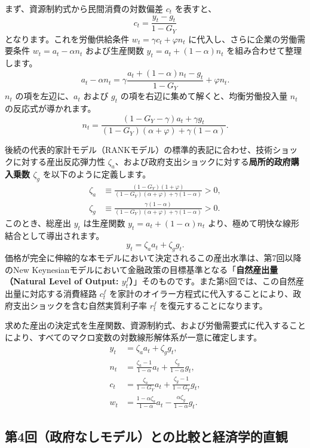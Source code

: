 \documentclass[
  japanese,
  lualatex,
  ja=standard,
  12pt,
  a4paper]{ltjsarticle}
\begin{document}
まず、資源制約式から民間消費の対数偏差 \(c_t\) を表すと、 \[
c_t = \frac{y_t - g_t}{1-G_Y}
\] となります。これを労働供給条件 \(w_t = \gamma c_t + \varphi n_t\)
に代入し、さらに企業の労働需要条件 \(w_t = a_t - \alpha n_t\)
および生産関数 \(y_t = a_t + (1-\alpha)n_t\) を組み合わせて整理します。
\[
a_t - \alpha n_t = \gamma \frac{a_t + (1-\alpha)n_t - g_t}{1-G_Y} + \varphi n_t.
\] \(n_t\) の項を左辺に、\(a_t\) および \(g_t\)
の項を右辺に集めて解くと、均衡労働投入量 \(n_t\) の反応式が導かれます。
\[
n_t = \frac{(1-G_Y-\gamma) a_t + \gamma g_t}{(1-G_Y)(\alpha+\varphi) + \gamma(1-\alpha)}.
\]

後続の代表的家計モデル（RANKモデル）の標準的表記に合わせ、技術ショックに対する産出反応弾力性
\(\zeta_a\)、および政府支出ショックに対する\textbf{局所的政府購入乗数
\(\zeta_g\)} を以下のように定義します。 \[
\begin{aligned}
\zeta_a &\equiv \frac{(1-G_Y)(1+\varphi)}{(1-G_Y)(\alpha+\varphi) + \gamma(1-\alpha)} > 0,\\
\zeta_g &\equiv \frac{\gamma(1-\alpha)}{(1-G_Y)(\alpha+\varphi) + \gamma(1-\alpha)} > 0.
\end{aligned}
\] このとき、総産出 \(y_t\) は生産関数 \(y_t = a_t + (1-\alpha)n_t\)
より、極めて明快な線形結合として導出されます。 \[
y_t = \zeta_a a_t + \zeta_g g_t.
\]
価格が完全に伸縮的な本モデルにおいて決定されるこの産出水準は、第7回以降のNew
Keynesianモデルにおいて金融政策の目標基準となる「\textbf{自然産出量（Natural
Level of Output:
\(y_t^f\)）}」そのものです。また第8回では、この自然産出量に対応する消費経路
\(c_t^f\)
を家計のオイラー方程式に代入することにより、政府支出ショックを含む自然実質利子率
\(r_t^f\) を復元することになります。

求めた産出の決定式を生産関数、資源制約式、および労働需要式に代入することにより、すべてのマクロ変数の対数線形解体系が一意に確定します。
\[
\begin{aligned}
y_t &= \zeta_a a_t + \zeta_g g_t,\\
n_t &= \frac{\zeta_a - 1}{1-\alpha} a_t + \frac{\zeta_g}{1-\alpha} g_t,\\
c_t &= \frac{\zeta_a}{1-G_Y} a_t + \frac{\zeta_g - 1}{1-G_Y} g_t,\\
w_t &= \frac{1-\alpha\zeta_a}{1-\alpha} a_t - \frac{\alpha\zeta_g}{1-\alpha} g_t.
\end{aligned}
\]

\subsection{第4回（政府なしモデル）との比較と経済学的直観}\label{ux7b2c4ux56deux653fux5e9cux306aux3057ux30e2ux30c7ux30ebux3068ux306eux6bd4ux8f03ux3068ux7d4cux6e08ux5b66ux7684ux76f4ux89b3}
\end{document}

